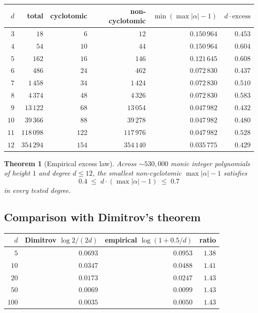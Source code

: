 \documentclass[11pt,a4paper]{article}
\newtheorem{theorem}{Theorem}[section]
\begin{document}
\begin{center}
\begin{tabular}{rrrrrr}
\toprule
$d$ & total & cyclotomic & non-cyclotomic & $\min (\max|\alpha| - 1)$ & $d \cdot \mathrm{excess}$ \\
\midrule
$3$  & $18$       & $6$   & $12$       & $0.150\,964$ & $0.453$ \\
$4$  & $54$       & $10$  & $44$       & $0.150\,964$ & $0.604$ \\
$5$  & $162$      & $16$  & $146$      & $0.121\,645$ & $0.608$ \\
$6$  & $486$      & $24$  & $462$      & $0.072\,830$ & $0.437$ \\
$7$  & $1\,458$    & $34$  & $1\,424$    & $0.072\,830$ & $0.510$ \\
$8$  & $4\,374$    & $48$  & $4\,326$    & $0.072\,830$ & $0.583$ \\
$9$  & $13\,122$   & $68$  & $13\,054$   & $0.047\,982$ & $0.432$ \\
$10$ & $39\,366$   & $88$  & $39\,278$   & $0.047\,982$ & $0.480$ \\
$11$ & $118\,098$  & $122$ & $117\,976$  & $0.047\,982$ & $0.528$ \\
$12$ & $354\,294$  & $154$ & $354\,140$  & $0.035\,775$ & $0.429$ \\
\bottomrule
\end{tabular}
\end{center}

\begin{theorem}[Empirical excess law]\label{thm:excess-law}
Across $\sim 530{,}000$ monic integer polynomials of height $1$ and degree
$d \le 12$, the smallest non-cyclotomic $\max|\alpha| - 1$ satisfies
\[
0.4 \;\le\; d \cdot (\max|\alpha| - 1) \;\le\; 0.7
\]
in every tested degree.
\end{theorem}

\subsection{Comparison with Dimitrov's theorem}
\begin{center}
\begin{tabular}{rrrr}
\toprule
$d$ & Dimitrov $\log 2/(2d)$ & empirical $\log(1 + 0.5/d)$ & ratio \\
\midrule
$5$  & $0.0693$ & $0.0953$ & $1.38$ \\
$10$ & $0.0347$ & $0.0488$ & $1.41$ \\
$20$ & $0.0173$ & $0.0247$ & $1.43$ \\
$50$ & $0.0069$ & $0.0099$ & $1.43$ \\
$100$ & $0.0035$ & $0.0050$ & $1.43$ \\
\bottomrule
\end{tabular}
\end{center}
\end{document}
